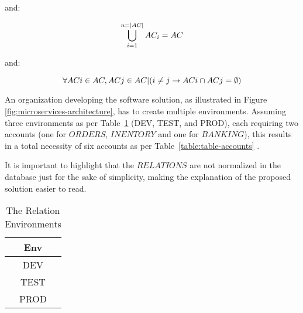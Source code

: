 and:

\begin{equation*}
    \begin{centering}
        \bigcup_{i=1}^{n = |AC|} AC_i = AC 
    \end{centering}
\end{equation*}

and:

\begin{equation*}
    \begin{centering}
        \forall ACi \in AC, ACj \in AC | (i \neq j \rightarrow ACi \cap ACj = \emptyset)
    \end{centering}
\end{equation*}

\vspace{15pt}

An organization developing the software solution, as illustrated in Figure \ref{fig:microservices-architecture}, has to create multiple environments. 
Assuming three environments as per Table~\ref{table:table-environments} (DEV, TEST, and PROD), each requiring two accounts (one for $ORDERS$, $INENTORY$ and one for $BANKING$), this results in a total necessity of six accounts as per Table~\ref{table:table-accounts} .

\begin{boxF}
    It is important to highlight that the $RELATIONS$ are not normalized in the database just for the sake of simplicity, making the explanation of the proposed solution easier to read.
\end{boxF}

\begin{table}[h]
    \caption{The Relation Environments}
    \label{table:table-environments}
    \begin{center}
    \begin{tabular}{|c|}
    \hline
    Env\\
    \hline
    DEV \\
    \hline
    TEST \\
    \hline
    PROD \\
    \hline
    \end{tabular}
    \end{center}
\end{table}

